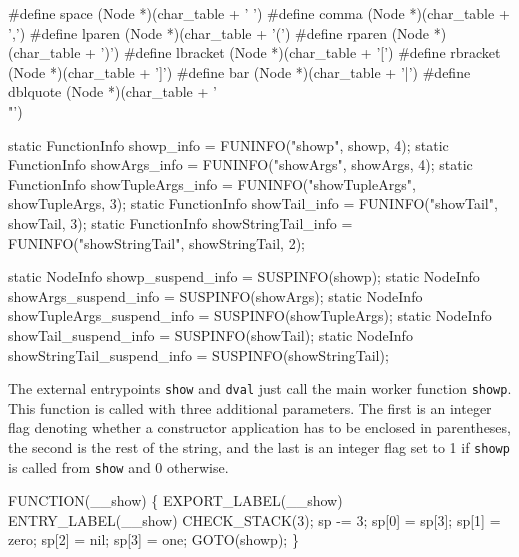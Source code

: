 #define space    (Node *)(char_table + ' ')
#define comma    (Node *)(char_table + ',')
#define lparen   (Node *)(char_table + '(')
#define rparen   (Node *)(char_table + ')')
#define lbracket (Node *)(char_table + '[')
#define rbracket (Node *)(char_table + ']')
#define bar      (Node *)(char_table + '|')
#define dblquote (Node *)(char_table + '\\"')

static FunctionInfo showp_info = FUNINFO("showp", showp, 4);
static FunctionInfo showArgs_info = FUNINFO("showArgs", showArgs, 4);
static FunctionInfo showTupleArgs_info = 
    FUNINFO("showTupleArgs", showTupleArgs, 3);
static FunctionInfo showTail_info = FUNINFO("showTail", showTail, 3);
static FunctionInfo showStringTail_info =
    FUNINFO("showStringTail", showStringTail, 2);

static NodeInfo showp_suspend_info = SUSPINFO(showp);
static NodeInfo showArgs_suspend_info = SUSPINFO(showArgs);
static NodeInfo showTupleArgs_suspend_info = SUSPINFO(showTupleArgs);
static NodeInfo showTail_suspend_info = SUSPINFO(showTail);
static NodeInfo showStringTail_suspend_info = SUSPINFO(showStringTail);

\nwendcode{}\nwdocspar
The external entrypoints \texttt{show} and \texttt{dval} just call the
main worker function \texttt{showp}. This function is called with
three additional parameters. The first is an integer flag denoting
whether a constructor application has to be enclosed in parentheses,
the second is the rest of the string, and the last is an integer flag
set to 1 if \texttt{showp} is called from \texttt{show} and 0
otherwise.

\nwenddocs{}\plusendmoddef\nwstartdeflinemarkup{}\nwenddeflinemarkup
FUNCTION(__show)
\{
    EXPORT_LABEL(__show)
 ENTRY_LABEL(__show)
    CHECK_STACK(3);
    sp   -= 3;
    sp[0] = sp[3];
    sp[1] = zero;
    sp[2] = nil;
    sp[3] = one;
    GOTO(showp);
\}

